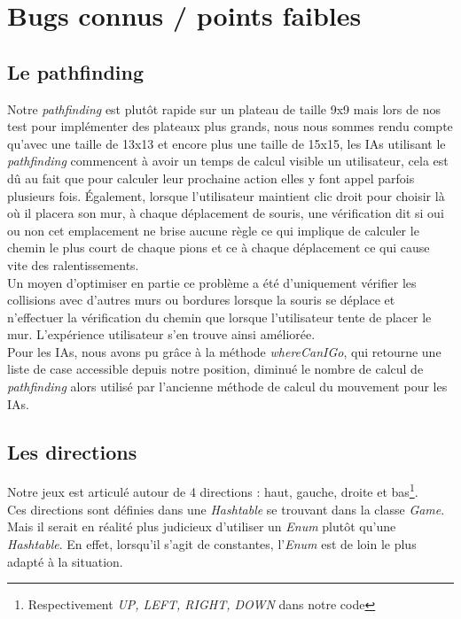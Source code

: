 \documentclass[a4paper, 12pt]{article}
\begin{document}
\section{Bugs connus / points faibles}

\subsection{Le pathfinding}
Notre \textit{pathfinding} est plutôt rapide sur un plateau de taille 9x9 mais lors de nos test pour implémenter des plateaux plus grands, nous nous sommes rendu compte qu'avec une taille de 13x13 et encore plus une taille de 15x15, les IAs utilisant le \textit{pathfinding} commencent à avoir un temps de calcul visible un utilisateur, cela est dû au fait que pour calculer leur prochaine action elles y font appel parfois plusieurs fois. Également, lorsque l'utilisateur maintient clic droit pour choisir là où il placera son mur, à chaque déplacement de souris, une vérification dit si oui ou non cet emplacement ne brise aucune règle ce qui implique de calculer le chemin le plus court de chaque pions et ce à chaque déplacement ce qui cause vite des ralentissements. \\

Un moyen d'optimiser en partie ce problème a été d'uniquement vérifier les collisions avec d'autres murs ou bordures lorsque la souris se déplace et n'effectuer la vérification du chemin que lorsque l'utilisateur tente de placer le mur. L'expérience utilisateur s'en trouve ainsi améliorée. \\
Pour les IAs, nous avons pu grâce à la méthode \textit{whereCanIGo}, qui retourne une liste de case accessible depuis notre position, diminué le nombre de calcul de \textit{pathfinding} alors utilisé par l'ancienne méthode de calcul du mouvement pour les IAs.

\subsection{Les directions}
Notre jeux est articulé autour de 4 directions : haut, gauche, droite et bas\footnote{Respectivement \textit{UP, LEFT, RIGHT, DOWN} dans notre code}. \\
Ces directions sont définies dans une \textit{Hashtable} se trouvant dans la classe \textit{Game}. Mais il serait en réalité plus judicieux d'utiliser un \textit{Enum} plutôt qu'une \textit{Hashtable}. En effet, lorsqu'il s'agit de constantes, l'\textit{Enum} est de loin le plus adapté à la situation. 
\end{document}
